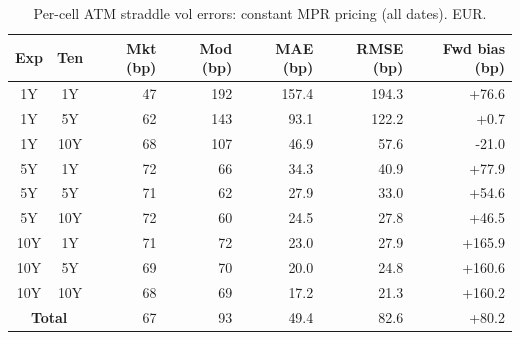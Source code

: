 \begin{table}[H]
\centering
\caption{Per-cell ATM straddle vol errors: constant MPR pricing (all dates). EUR.}
\label{tab:constant_mpr_per_cell_all}
\small
\begin{tabular}{@{}ccrrrrr@{}}
\toprule
\textbf{Exp} & \textbf{Ten} & \textbf{Mkt (bp)} & \textbf{Mod (bp)} & \textbf{MAE (bp)} & \textbf{RMSE (bp)} & \textbf{Fwd bias (bp)} \\
\midrule
  1Y & 1Y & 47 & 192 & 157.4 & 194.3 & +76.6 \\
  1Y & 5Y & 62 & 143 & 93.1 & 122.2 & +0.7 \\
  1Y & 10Y & 68 & 107 & 46.9 & 57.6 & -21.0 \\
  \midrule
  5Y & 1Y & 72 & 66 & 34.3 & 40.9 & +77.9 \\
  5Y & 5Y & 71 & 62 & 27.9 & 33.0 & +54.6 \\
  5Y & 10Y & 72 & 60 & 24.5 & 27.8 & +46.5 \\
  \midrule
  10Y & 1Y & 71 & 72 & 23.0 & 27.9 & +165.9 \\
  10Y & 5Y & 69 & 70 & 20.0 & 24.8 & +160.6 \\
  10Y & 10Y & 68 & 69 & 17.2 & 21.3 & +160.2 \\
  \midrule
  \multicolumn{2}{c}{\textbf{Total}} & 67 & 93 & 49.4 & 82.6 & +80.2 \\
\bottomrule
\end{tabular}
\end{table}